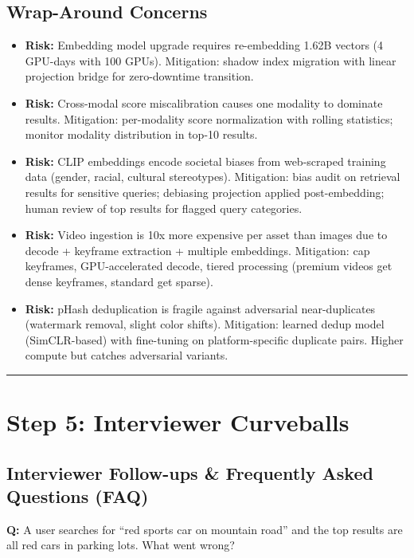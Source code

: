 \subsection*{Wrap-Around Concerns}

\begin{itemize}
  \item \textbf{Risk:} Embedding model upgrade requires re-embedding 1.62B vectors (4 GPU-days with 100 GPUs). Mitigation: shadow index migration with linear projection bridge for zero-downtime transition.
  \item \textbf{Risk:} Cross-modal score miscalibration causes one modality to dominate results. Mitigation: per-modality score normalization with rolling statistics; monitor modality distribution in top-10 results.
  \item \textbf{Risk:} CLIP embeddings encode societal biases from web-scraped training data (gender, racial, cultural stereotypes). Mitigation: bias audit on retrieval results for sensitive queries; debiasing projection applied post-embedding; human review of top results for flagged query categories.
  \item \textbf{Risk:} Video ingestion is 10x more expensive per asset than images due to decode + keyframe extraction + multiple embeddings. Mitigation: cap keyframes, GPU-accelerated decode, tiered processing (premium videos get dense keyframes, standard get sparse).
  \item \textbf{Risk:} pHash deduplication is fragile against adversarial near-duplicates (watermark removal, slight color shifts). Mitigation: learned dedup model (SimCLR-based) with fine-tuning on platform-specific duplicate pairs. Higher compute but catches adversarial variants.
\end{itemize}

\bigskip\hrule\bigskip

\section*{Step 5: Interviewer Curveballs}

\subsection*{Interviewer Follow-ups \& Frequently Asked Questions (FAQ)}

\textbf{Q:} A user searches for ``red sports car on mountain road'' and the top results are all red cars in parking lots. What went wrong?

